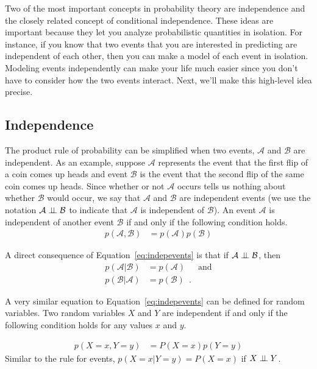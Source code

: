 \documentclass[assignment02_Solutions]{subfiles}
\begin{document}
Two of the most important concepts in probability theory are independence and the closely related concept of conditional independence.  These ideas are important because they let you analyze probabilistic quantities in isolation.  For instance, if you know that two events that you are interested in predicting are independent of each other, then you can make a model of each event in isolation.  Modeling events independently can make your life much easier since you don't have to consider how the two events interact.  Next, we'll make this high-level idea precise.

\subsection{Independence}
The product rule of probability can be simplified when two events, $\mathcal{A}$ and $\mathcal{B}$ are independent.  As an example, suppose $\mathcal{A}$ represents the event that the first flip of a coin comes up heads and event $\mathcal{B}$ is the event that the second flip of the same coin comes up heads.  Since whether or not $\mathcal{A}$ occurs tells us nothing about whether $\mathcal{B}$ would occur, we say that $\mathcal{A}$ and $\mathcal{B}$ are independent events (we use the notation $\mathcal{A} \perp\!\!\!\perp \mathcal{B}$ to indicate that $\mathcal{A}$ is independent of $\mathcal{B}$).  An event $\mathcal{A}$ is independent of another event $\mathcal{B}$ if and only if the following condition holds.
\begin{align}
p(\mathcal{A}, \mathcal{B}) &= p(\mathcal{A}) p(\mathcal{B}) \label{eq:indepevents}
\end{align}

A direct consequence of Equation~\ref{eq:indepevents} is that if $\mathcal{A} \perp\!\!\!\perp \mathcal{B}$, then
\begin{align}
p(\mathcal{A} | \mathcal{B}) &= p(\mathcal{A}) & \mbox{and} \nonumber \\
p(\mathcal{B} | \mathcal{A}) &= p(\mathcal{B}) \enspace . \nonumber
\end{align}

A very similar equation to Equation~\ref{eq:indepevents} can be defined for random variables.  Two random variables $X$ and $Y$ are independent if and only if the following condition holds for any values $x$ and $y$.

\begin{align}
p(X=x, Y=y) &= P(X=x) p(Y=y)
\end{align}
Similar to the rule for events, $p(X=x | Y=y) = P(X=x)$ if $X \perp\!\!\!\perp Y$.
\end{document}
